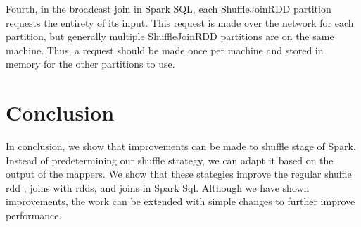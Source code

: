 Fourth, in the broadcast join in Spark SQL, each ShuffleJoinRDD partition requests the entirety of its input.
This request is made over the network for each partition, but generally multiple ShuffleJoinRDD partitions are on the same machine.
Thus, a request should be made once per machine and stored in memory for the other partitions to use. 

\section {Conclusion}
In conclusion, we show that improvements can be made to shuffle stage of Spark.
Instead of predetermining our shuffle strategy, we can adapt it based on the output of the mappers.
We show that these stategies improve  the regular shuffle rdd ,  joins with rdds, and  
joins in Spark Sql. Although we have shown improvements, the work can be extended with simple changes
to further improve performance. 



